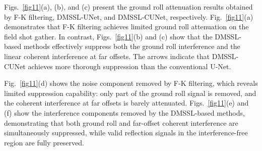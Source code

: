 \documentclass[a4paper,fleqn]{cas-dc}
\begin{document}
Figs.~\ref{fig11}(a), (b), and (c) present the ground roll attenuation 
results obtained by F-K filtering, DMSSL-UNet, and DMSSL-CUNet, respectively. 
Fig.~\ref{fig11}(a) demonstrates that F-K filtering achieves limited ground 
roll attenuation on the field shot gather. In contrast, Figs.~\ref{fig11}(b) 
and (c) show that the DMSSL-based methods effectively suppress both the ground roll 
interference and the linear coherent interference at far offsets. The arrows indicate that 
DMSSL-CUNet achieves more thorough suppression than the conventional U-Net.

Fig.~\ref{fig11}(d) shows the noise component removed by F-K filtering, 
which reveals limited suppression capability: only part of the ground roll signal is removed, 
and the coherent interference at far offsets is barely attenuated. 
Figs.~\ref{fig11}(e) and (f) show the interference components removed by 
the DMSSL-based methods, demonstrating that both ground roll and far-offset coherent 
interference are simultaneously suppressed, while valid reflection signals in the 
interference-free region are fully preserved.
\end{document}
